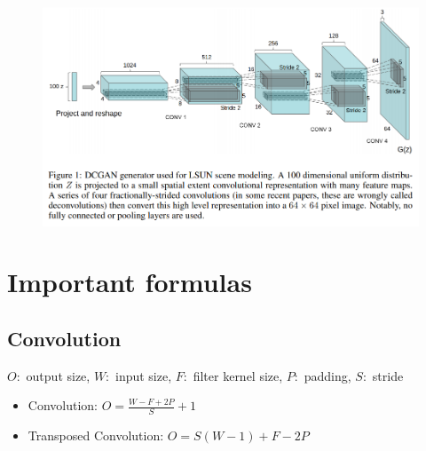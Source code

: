 \documentclass{scrartcl}
\begin{document}
\begin{figure}
	\centering
		\includegraphics[scale=0.5]{img/dcgan_arch}
	\label{fig:dcgan_arch}
\end{figure}

\section{Important formulas}
\subsection{Convolution}
$O:$ output size, $W:$ input size, $F:$ filter kernel size, $P:$ padding, $S:$ stride
\begin{itemize}
	\item
		Convolution: $O = \frac{W - F + 2P}{S} + 1$
	\item
		Transposed Convolution: $O = S(W-1) + F - 2P$
\end{itemize}
\end{document}
